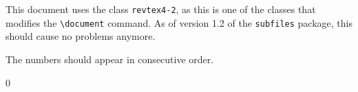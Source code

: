 \documentclass{revtex4-2}
\begin{document}
This document uses the class \verb|revtex4-2|, as this is one of the
classes that modifies the \verb|\document| command. As of version 1.2
of the \verb|subfiles| package, this should cause no problems anymore.

The numbers should appear in consecutive order.

0




\end{document}
